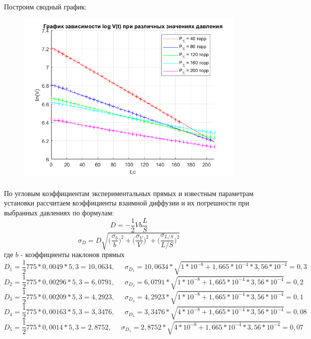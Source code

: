 \documentclass[a4paper,12pt]{article}
\begin{document}
Построим сводный график:
\begin{figure}[h]
\begin{center}
\includegraphics[width=0.5\linewidth]{graph_2.png}
\label{graph} 
\end{center}
\end{figure}

\paragraph{}
По угловым коэффициентам экспериментальных прямых и известным параметрам установки рассчитаем коэффициенты взаимной диффузии и их погрешности при выбранных давлениях по формулам:
\begin{equation} 
D =  -\frac{1}{2} Vb \frac{L}{S}
\end{equation}
\begin{equation}
\sigma_D = D \sqrt{\big(\frac{\sigma_b}{b}\big)^2 + \big(\frac{\sigma_V }{V}\big)^2 + \big(\frac{\sigma_{L/S}}{L/S}\big)^2}
\end{equation}
где $b$ - коэффициенты наклонов прямых
\begin{equation*} 
D_1 =  \frac{1}{2} 775*0,0049 *5,3 = 10,0634, \;\;\;\;\; \sigma_{D_1} = 10,0634*\sqrt{1*10^{-8} + 1,665 * 10^{-4} * 3,56 * 10^{-4}} = 0,3
\end{equation*}
\begin{equation*} 
D_2 =  \frac{1}{2} 775*0,00296 *5,3 = 6,0791, \;\;\;\;\; \sigma_{D_2} = 6,0791*\sqrt{1*10^{-8} + 1,665 * 10^{-4} * 3,56 * 10^{-4}} = 0,2
\end{equation*}
\begin{equation*} 
D_3 =  \frac{1}{2} 775*0,00209 *5,3 = 4,2923, \;\;\;\;\; \sigma_{D_3} = 4,2923*\sqrt{1*10^{-8} + 1,665 * 10^{-4} * 3,56 * 10^{-4}} = 0,1
\end{equation*}
\begin{equation*} 
D_4 =  \frac{1}{2} 775*0,00163 *5,3 = 3,3476, \;\;\;\;\; \sigma_{D_4} = 3,3476*\sqrt{4*10^{-8} + 1,665 * 10^{-4} * 3,56 * 10^{-4}} = 0,08
\end{equation*}
\begin{equation*} 
D_5 =  \frac{1}{2} 775*0,0014 *5,3 = 2,8752 , \;\;\;\;\; \sigma_{D_5} = 2,8752*\sqrt{4*10^{-8} + 1,665 * 10^{-4} * 3,56 * 10^{-4}} = 0,07
\end{equation*}
\end{document}

